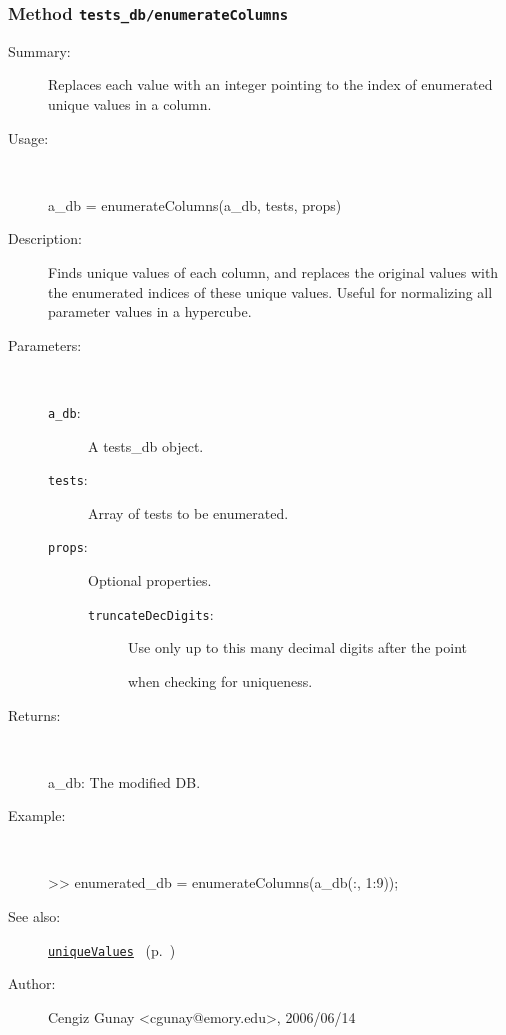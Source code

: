 \subsubsection[Method \texttt{enumerateColumns}]{Method \texttt{tests\_db/enumerateColumns}}%
%
\label{ref_tests_db__enumerateColumns}%
\hypertarget{ref_tests_db__enumerateColumns}{}%
\begin{description}
\item[Summary:]Replaces each value with an integer pointing to the index of enumerated unique values in a column.
%
\item[Usage:]~%
\begin{lyxcode}%
a\_db = enumerateColumns(a\_db, tests, props)
%
\end{lyxcode}%
%
\item[Description:]%
Finds unique values of each column, and replaces the original values
 with the enumerated indices of these unique values. Useful for normalizing all 
 parameter values in a hypercube.
\item[Parameters:]~
\begin{description}%
\item[\texttt{a\_db}:]
 A tests\_db object.
\item[\texttt{tests}:]
 Array of tests to be enumerated.
\item[\texttt{props}:]
 Optional properties.
\begin{description}%
\item[\texttt{truncateDecDigits}:]
 Use only up to this many decimal digits after the point 

when checking for uniqueness.\end{description}%
\end{description}%
%
\item[Returns:]~

	a\_db: The modified DB.
%
\item[Example:]~
\begin{lyxcode} >> enumerated\_db = enumerateColumns(a\_db(:, 1:9));\\%
\end{lyxcode}
%
\item[See also:]%
\hyperlink{ref_uniqueValues}{\texttt{uniqueValues}}%
\ (p.~\pageref{ref_uniqueValues})%
%
%
\item[Author:]%
Cengiz Gunay <cgunay@emory.edu>, 2006/06/14%
\end{description}
\methodline%
